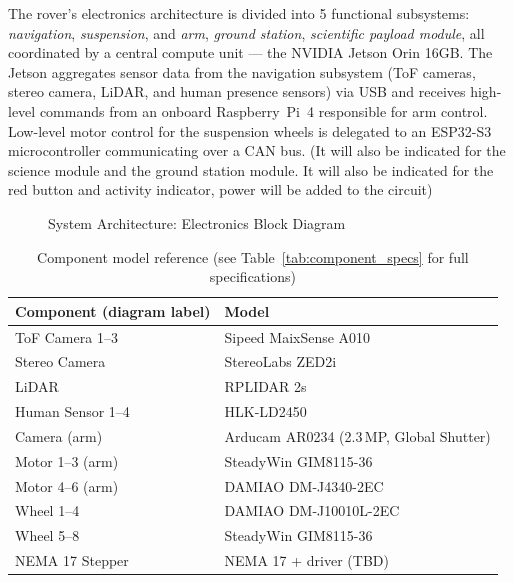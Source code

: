 

The rover's electronics architecture is divided into 5 functional
subsystems: \textit{navigation}, \textit{suspension}, and \textit{arm},
\textit{ground station}, \textit{scientific
payload module},
all coordinated by a central compute unit --- the NVIDIA Jetson Orin 16GB.
The Jetson aggregates sensor data from the navigation subsystem (ToF cameras,
stereo camera, LiDAR, and human presence sensors) via USB and receives
high-level commands from an onboard Raspberry~Pi~4 responsible for arm
control. Low-level motor control for the suspension wheels is delegated to
an ESP32-S3 microcontroller communicating over a CAN bus. (It will also be indicated for the science module and the ground station module. It will also be indicated for the red button and activity indicator, power will be added to the circuit)


\begin{figure}[H]
  \centering
  \caption{
System Architecture: Electronics Block Diagram}
  \label{fig:block_diagram}
\end{figure}

\begin{table}[H]
  \centering
  \caption{Component model reference
           (see Table~\ref{tab:component_specs} for full specifications)}
  \label{tab:component_models}
  \small
  \begin{tabular}{ll}
    \toprule
    \textbf{Component (diagram label)} & \textbf{Model} \\
    \midrule
    ToF Camera 1--3       & Sipeed MaixSense A010 \\
    Stereo Camera         & StereoLabs ZED2i \\
    LiDAR                 & RPLIDAR 2s \\
    Human Sensor 1--4     & HLK-LD2450 \\
    Camera (arm)          & Arducam AR0234 (2.3\,MP, Global Shutter) \\
    Motor 1--3 (arm)      & SteadyWin GIM8115-36 \\
    Motor 4--6 (arm)      & DAMIAO DM-J4340-2EC \\
    Wheel 1--4            & DAMIAO DM-J10010L-2EC \\
    Wheel 5--8            & SteadyWin GIM8115-36 \\
    NEMA 17 Stepper       & NEMA 17 + driver (TBD) \\
    \bottomrule
  \end{tabular}
\end{table}
